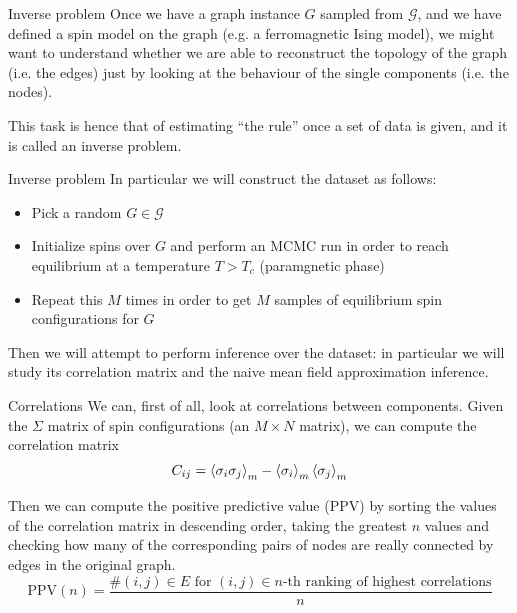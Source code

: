 \documentclass[handout]{beamer}
\begin{document}
\begin{frame}{Inverse problem}
    Once we have a graph instance $G$ sampled from $\mathcal{G}$, and we have
    defined a spin model on the graph (e.g. a ferromagnetic Ising model), we
    might want to understand whether we are able to \alert{reconstruct} the
    topology of the graph (i.e. the edges) just by looking at the behaviour of
    the single components (i.e. the nodes).
    
    This task is hence that of estimating ``the rule'' once a set of data is
    given, and it is called an \alert{inverse problem}.
\end{frame}

\begin{frame}{Inverse problem}
    In particular we will construct the dataset as follows:
    \begin{itemize}
        \item Pick a random $G \in \mathcal{G}$
        \item Initialize spins over $G$ and perform an MCMC run in order to
            reach equilibrium at a temperature $T > T_c$ (\alert{paramgnetic}
            phase)
        \item Repeat this $M$ times in order to get $M$ samples of equilibrium
            spin configurations for $G$
    \end{itemize}

    Then we will attempt to perform inference over the dataset: in particular we
    will study its \alert{correlation matrix} and the \alert{naive mean field
    approximation inference}.
\end{frame}

\begin{frame}{Correlations}
    We can, first of all, look at correlations between components. Given the
    $\Sigma$ matrix of spin configurations (an $M \times N$ matrix), we can
    compute the \alert{correlation matrix}
    \begin{equation}
        C_{ij} = \expval{\sigma_i \sigma_j}_m - \expval{\sigma_i}_m
        \expval{\sigma_j}_m
    \end{equation}

    Then we can compute the \alert{positive predictive value} (PPV) by sorting
    the values of the correlation matrix in descending order, taking the
    greatest $n$ values and checking how many of the corresponding pairs of
    nodes are really connected by edges in the original graph.
    \begin{equation}
        \text{PPV}(n) = \frac{\#(i, j) \in E\text{ for }(i, j) \in n\text{-th
        ranking of highest correlations}}{n}
    \end{equation}
\end{frame}
\end{document}

